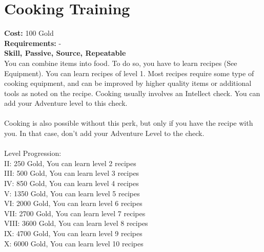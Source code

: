 \section{Cooking Training}
\textbf{Cost:} 100 Gold\\
\textbf{Requirements:} -\\
\textbf{Skill, Passive, Source, Repeatable}\\
You can combine items into food. To do so, you have to learn recipes (See Equipment). You can learn recipes of level 1. Most recipes require some type of cooking equipment, and can be improved by higher quality items or additional tools as noted on the recipe. Cooking usually involves an Intellect check. You can add your Adventure level to this check. \\
\\
Cooking is also possible without this perk, but only if you have the recipe with you. In that case, don't add your Adventure Level to the check.\\
\\
Level Progression:\\
II: 250 Gold, You can learn level 2 recipes\\
III: 500 Gold, You can learn level 3 recipes\\
IV: 850 Gold, You can learn level 4 recipes\\
V: 1350 Gold, You can learn level 5 recipes\\
VI: 2000 Gold, You can learn level 6 recipes\\
VII: 2700 Gold, You can learn level 7 recipes\\
VIII: 3600 Gold, You can learn level 8 recipes\\
IX: 4700 Gold, You can learn level 9 recipes\\
X: 6000 Gold, You can learn level 10 recipes\\